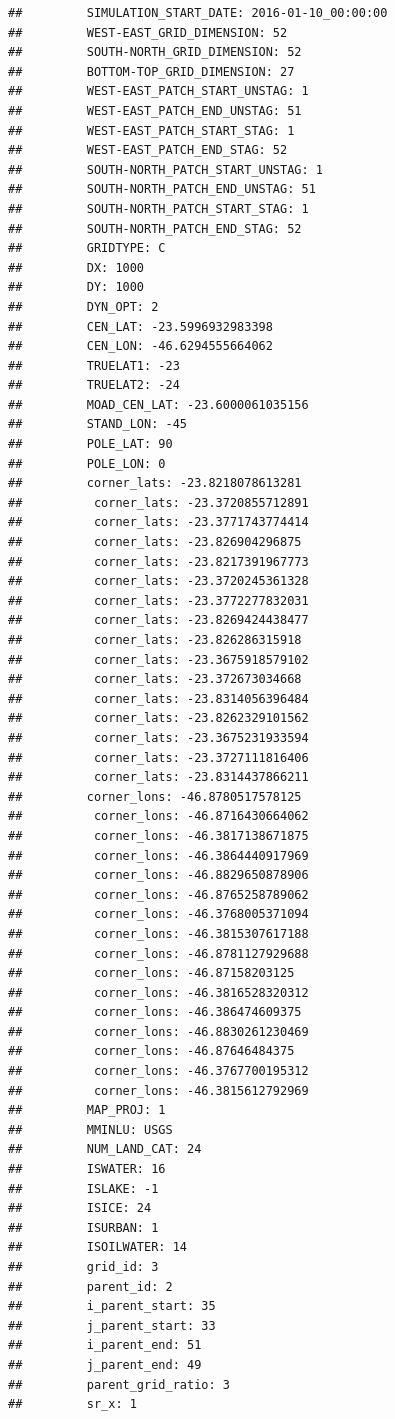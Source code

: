 \documentclass[]{book}
\theoremstyle{definition}
\theoremstyle{definition}
\theoremstyle{definition}
\theoremstyle{remark}
\begin{document}
\begin{verbatim}
##         SIMULATION_START_DATE: 2016-01-10_00:00:00
##         WEST-EAST_GRID_DIMENSION: 52
##         SOUTH-NORTH_GRID_DIMENSION: 52
##         BOTTOM-TOP_GRID_DIMENSION: 27
##         WEST-EAST_PATCH_START_UNSTAG: 1
##         WEST-EAST_PATCH_END_UNSTAG: 51
##         WEST-EAST_PATCH_START_STAG: 1
##         WEST-EAST_PATCH_END_STAG: 52
##         SOUTH-NORTH_PATCH_START_UNSTAG: 1
##         SOUTH-NORTH_PATCH_END_UNSTAG: 51
##         SOUTH-NORTH_PATCH_START_STAG: 1
##         SOUTH-NORTH_PATCH_END_STAG: 52
##         GRIDTYPE: C
##         DX: 1000
##         DY: 1000
##         DYN_OPT: 2
##         CEN_LAT: -23.5996932983398
##         CEN_LON: -46.6294555664062
##         TRUELAT1: -23
##         TRUELAT2: -24
##         MOAD_CEN_LAT: -23.6000061035156
##         STAND_LON: -45
##         POLE_LAT: 90
##         POLE_LON: 0
##         corner_lats: -23.8218078613281
##          corner_lats: -23.3720855712891
##          corner_lats: -23.3771743774414
##          corner_lats: -23.826904296875
##          corner_lats: -23.8217391967773
##          corner_lats: -23.3720245361328
##          corner_lats: -23.3772277832031
##          corner_lats: -23.8269424438477
##          corner_lats: -23.826286315918
##          corner_lats: -23.3675918579102
##          corner_lats: -23.372673034668
##          corner_lats: -23.8314056396484
##          corner_lats: -23.8262329101562
##          corner_lats: -23.3675231933594
##          corner_lats: -23.3727111816406
##          corner_lats: -23.8314437866211
##         corner_lons: -46.8780517578125
##          corner_lons: -46.8716430664062
##          corner_lons: -46.3817138671875
##          corner_lons: -46.3864440917969
##          corner_lons: -46.8829650878906
##          corner_lons: -46.8765258789062
##          corner_lons: -46.3768005371094
##          corner_lons: -46.3815307617188
##          corner_lons: -46.8781127929688
##          corner_lons: -46.87158203125
##          corner_lons: -46.3816528320312
##          corner_lons: -46.386474609375
##          corner_lons: -46.8830261230469
##          corner_lons: -46.87646484375
##          corner_lons: -46.3767700195312
##          corner_lons: -46.3815612792969
##         MAP_PROJ: 1
##         MMINLU: USGS
##         NUM_LAND_CAT: 24
##         ISWATER: 16
##         ISLAKE: -1
##         ISICE: 24
##         ISURBAN: 1
##         ISOILWATER: 14
##         grid_id: 3
##         parent_id: 2
##         i_parent_start: 35
##         j_parent_start: 33
##         i_parent_end: 51
##         j_parent_end: 49
##         parent_grid_ratio: 3
##         sr_x: 1

\end{verbatim}
\end{document}
